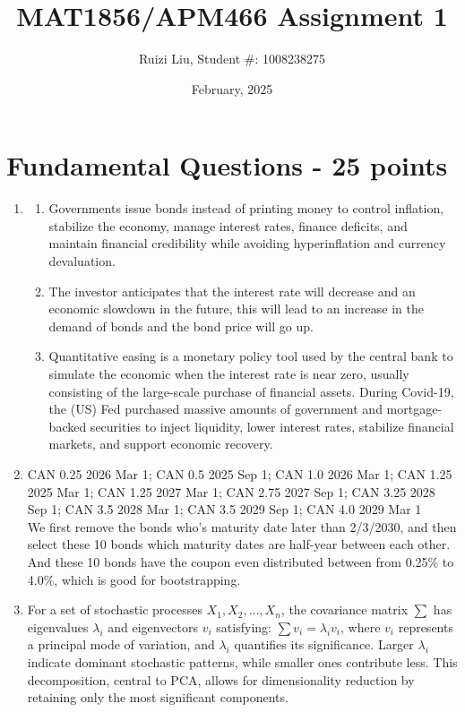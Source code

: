 \documentclass{article}
\title{MAT1856/APM466 Assignment 1}
\author{Ruizi Liu, Student \#: 1008238275}
\date{February, 2025}
\begin{document}
\maketitle

\section*{Fundamental Questions - 25 points}

\begin{enumerate}
    \item \hfill
    \begin{enumerate}
        \item Governments issue bonds instead of printing money to control inflation, stabilize the economy, manage interest rates, finance deficits, and maintain financial credibility while avoiding hyperinflation and currency devaluation.
        \item The investor anticipates that the interest rate will decrease and an economic slowdown in the future, this will lead to an increase in the demand of bonds and the bond price will go up. 
        \item Quantitative easing is a monetary policy tool used by the central bank to simulate the economic when the interest rate is near zero, usually consisting of the large-scale purchase of financial assets. During Covid-19, the (US) Fed purchased massive amounts of government and mortgage-backed securities to inject liquidity, lower interest rates, stabilize financial markets, and support economic recovery. 
\end{enumerate}
    \item 
    CAN 0.25 2026 Mar 1; CAN 0.5 2025 Sep 1; CAN 1.0 2026 Mar 1; CAN 1.25 2025 Mar 1; CAN 1.25 2027 Mar 1; CAN 2.75 2027 Sep 1; CAN 3.25 2028 Sep 1; CAN 3.5 2028 Mar 1; CAN 3.5 2029 Sep 1; CAN 4.0 2029 Mar 1\\
    We first remove the bonds who's maturity date later than 2/3/2030, and then select these 10 bonds which maturity dates are half-year between each other. And these 10 bonds have the coupon even distributed between from 0.25\% to 4.0\%, which is good for bootstrapping. 

    \item For a set of stochastic processes $X_1, X_2, \dots, X_n$, the covariance matrix $\sum$ has eigenvalues $\lambda_i$ and eigenvectors $v_i$ satisfying: $\sum v_i = \lambda_i v_i$, where $v_i$ represents a principal mode of variation, and $\lambda_i$ quantifies its significance. Larger $\lambda_i$ indicate dominant stochastic patterns, while smaller ones contribute less. This decomposition, central to PCA, allows for dimensionality reduction by retaining only the most significant components.
\end{enumerate} 
\end{document}
